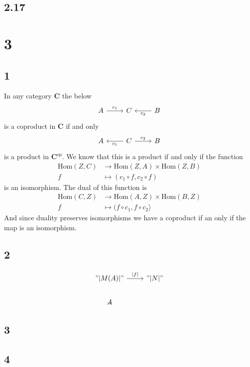 \documentclass{book}
\theoremstyle{definition}
\newcommand\Hom{\text{Hom}}
\begin{document}
\subsection{2.17}

\section{3}

\subsection{1}

In any category $\mathbf{C}$ the below
\[
  \begin{tikzcd}
    A \ar[r, "c_1"] & C & B \ar[l, "c_2"]
  \end{tikzcd}
\]
is a coproduct in $\mathbf{C}$ if and only
\[
  \begin{tikzcd}
    A & C \ar[l, "c_1"] \ar[r, "c_2"] & B
  \end{tikzcd}
\]
is a product in $\mathbf{C}^{op}$. We know that this is a product if and only if
the function
\begin{align*}
  \Hom(Z, C) & \to \Hom(Z, A) \times \Hom(Z, B) \\
  f & \mapsto ( c_1 \circ f, c_2 \circ f )
\end{align*}
is an isomorphism. The dual of this function is
\begin{align*}
  \Hom(C, Z) & \to \Hom(A, Z) \times \Hom(B, Z) \\
  f & \mapsto (f \circ c_1, f \circ c_2 \rangle
\end{align*}
And since duality preserves isomorphisms we have a coproduct if an only if the
map is an isomorphism.

\subsection{2}

\[
  \begin{tikzcd}
    "|M(A)|" \ar[r, "|f|"] & "|N|" \\
    A \ar[]
  \end{tikzcd}
\]

\subsection{3}

\subsection{4}
\end{document}
